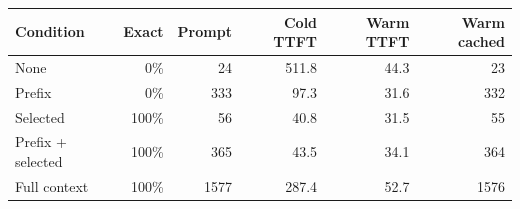 \begin{tabular}{lrrrrr}
\toprule
Condition & Exact & Prompt & Cold TTFT & Warm TTFT & Warm cached \\
\midrule
None & 0\% & 24 & 511.8 & 44.3 & 23 \\
Prefix & 0\% & 333 & 97.3 & 31.6 & 332 \\
Selected & 100\% & 56 & 40.8 & 31.5 & 55 \\
Prefix + selected & 100\% & 365 & 43.5 & 34.1 & 364 \\
Full context & 100\% & 1577 & 287.4 & 52.7 & 1576 \\
\bottomrule
\end{tabular}
